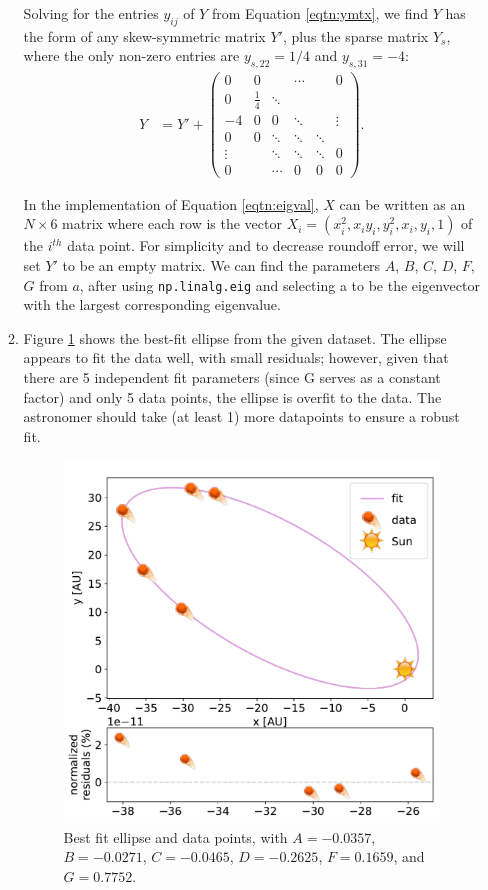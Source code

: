 \documentclass{article}
\newcommand{\code}{\texttt}
\begin{document}
\begin{enumerate}
\begin{enumerate}
        Solving for the entries $y_{ij}$ of $Y$ from Equation \ref{eqtn:ymtx}, we find $Y$ has the form of any skew-symmetric matrix $Y'$, plus the sparse matrix $Y_{s}$, where the only non-zero entries are $y_{s, 22}=1/4$ and $y_{s,31}=-4$:
        \begin{align}
            Y &= Y' +   \begin{pmatrix}
                0 & 0 &  & \cdots & & 0
                \\
                0 & \frac{1}{4} & \ddots & & & 
                \\
                -4 & 0 & 0 & \ddots & & \vdots
                \\
                0 & 0 & \ddots & \ddots & \ddots & 
                \\
                \vdots &  & \ddots &\ddots & \ddots  & 0
                \\
                0 &  & \cdots  & 0 & 0 & 0
              \end{pmatrix}.
        \end{align}

        In the implementation of Equation \ref{eqtn:eigval}, $X$ can be written as an $N\times 6$ matrix where each row is the vector $X_i = (x_i^2, x_iy_i, y_i^2, x_i, y_i, 1)$ of the $i^{th}$ data point. For simplicity and to decrease roundoff error, we will set $Y'$ to be an empty matrix. 
        We can find the parameters $A$, $B$, $C$, $D$, $F$, $G$ from $a$, after using \code{np.linalg.eig} and selecting a to be the eigenvector with the largest corresponding eigenvalue.
    \item Figure \ref{fig:1a} shows the best-fit ellipse from the given dataset. The ellipse appears to fit the data well, with small residuals; however, given that there are 5 independent fit parameters (since G serves as a constant factor) and only 5 data points, the ellipse is overfit to the data. 
    The astronomer should take (at least 1) more datapoints to ensure a robust fit. 
    \begin{figure}[H]
        \centering 
        \captionsetup{margin=3.2cm}
        \includegraphics[width=0.5\linewidth]{Q1a.pdf}
        \caption{\label{fig:1a} Best fit ellipse and data points, with $A=-0.0357$, $B=-0.0271$, $C=-0.0465$, $D=-0.2625$, $F=0.1659$, and $G=0.7752$.}
    \end{figure}
\end{enumerate}


\end{enumerate}
\end{document}
